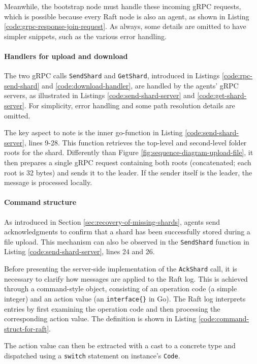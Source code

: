 Meanwhile, the bootstrap node must handle these incoming gRPC requests, which is possible because every Raft node is also an agent, as shown in Listing \ref{code:grpc-response-join-request}. As always, some details are omitted to have simpler snippets, such as the various error handling.

\paragraph{Handlers for upload and download}

The two gRPC calls \texttt{SendShard} and \texttt{GetShard}, introduced in Listings \ref{code:rpc-send-shard} and \ref{code:download-handler}, are handled by the agents' gRPC servers, as illustrated in Listings \ref{code:send-shard-server} and \ref{code:get-shard-server}. For simplicity, error handling and some path resolution details are omitted.

The key aspect to note is the inner go-function in Listing \ref{code:send-shard-server}, lines 9-28. This function retrieves the top-level and second-level folder roots for the shard. Differently than Figure \ref{fig:sequence-diagram-upload-file}, it then prepares a single gRPC request containing both roots (concatenated; each root is 32 bytes) and sends it to the leader. If the sender itself is the leader, the message is processed locally.

\paragraph{Command structure}

As introduced in Section \ref{sec:recovery-of-missing-shards}, agents send acknowledgments to confirm that a shard has been successfully stored during a file upload. This mechanism can also be observed in the \texttt{SendShard} function in Listing \ref{code:send-shard-server}, lines 24 and 26.

Before presenting the server-side implementation of the \texttt{AckShard} call,
it is necessary to clarify how messages are applied to the Raft log. This is
achieved through a command-style object, consisting of an operation code (a
simple integer) and an action value (an \texttt{interface\{\}} in Go). The Raft log interprets entries by first examining the operation code and then processing the corresponding action value. The definition is shown in Listing \ref{code:command-struct-for-raft}.


The action value can then be extracted with a cast to a concrete type and
dispatched using a \texttt{switch} statement on instance's \texttt{Code}.

